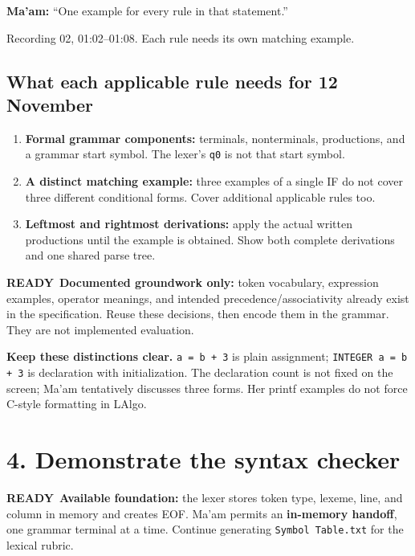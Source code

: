 \documentclass[11pt,a4paper]{article}
\newcommand{\code}[1]{\texttt{#1}}
\newcommand{\good}{\textcolor{ready}{\bfseries READY}}
\newcommand{\boxnote}[3]{\par\smallskip\begingroup\setlength{\fboxsep}{8pt}\colorbox{#1}{\parbox{\dimexpr\linewidth-2\fboxsep\relax}{\color{#2}\small #3}}\endgroup\par\smallskip}
\newcommand{\readybox}[1]{\boxnote{readybg}{ready}{#1}}
\newcommand{\neutralbox}[1]{\boxnote{cream}{black}{#1}}
\newcommand{\profquote}[2]{\neutralbox{\textbf{Ma'am:} ``#1''\par{\footnotesize\color{muted}#2}}}
\begin{document}
\profquote{One example for every rule in that statement.}{Recording 02, 01:02--01:08. Each rule needs its own matching example.}

\subsection{What each applicable rule needs for 12 November}
\begin{enumerate}
\item \textcolor{focus}{\textbf{Formal grammar components:}} terminals, nonterminals, productions,
and a grammar start symbol. The lexer's \code{q0} is not that start symbol.
\item \textcolor{focus}{\textbf{A distinct matching example:}} three examples of a single IF do not cover
three different conditional forms. Cover additional applicable rules too.
\item \textcolor{focus}{\textbf{Leftmost and rightmost derivations:}} apply the actual written productions
until the example is obtained. Show both complete derivations and one shared parse tree.
\end{enumerate}

\readybox{\good\ \textbf{Documented groundwork only:} token vocabulary, expression examples,
operator meanings, and intended precedence/associativity already exist in the specification.
Reuse these decisions, then encode them in the grammar. They are not implemented evaluation.}

\neutralbox{\textbf{Keep these distinctions clear.} \code{a = b + 3} is plain assignment;
\code{INTEGER a = b + 3} is declaration with initialization. The declaration count is not
fixed on the screen; Ma'am tentatively discusses three forms. Her printf examples do not
force C-style formatting in LAlgo.}

\clearpage
\section{4. Demonstrate the syntax checker}
\readybox{\good\ \textbf{Available foundation:} the lexer stores token type, lexeme, line, and column
in memory and creates EOF. Ma'am permits an \textbf{in-memory handoff}, one grammar terminal
at a time. Continue generating \code{Symbol Table.txt} for the lexical rubric.}
\end{document}
